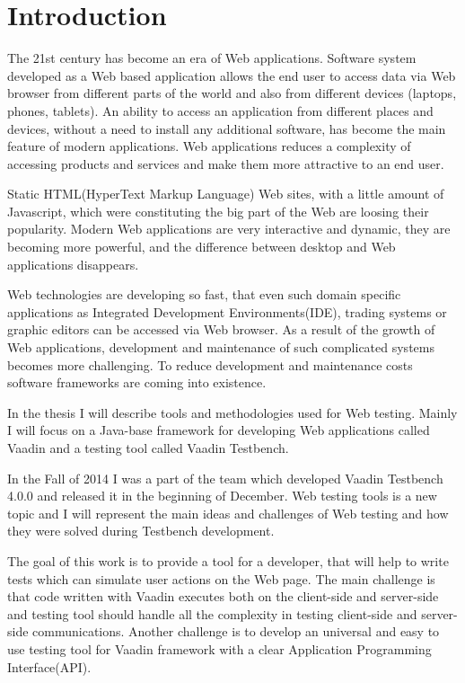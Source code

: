 	
	 \chapter{Introduction}
	 \label{ch:intro} 		
	The 21st century has become an era of Web applications. Software system
	developed as a Web based application allows the end user to access data via
	Web browser from different parts of the world and also from different devices
	(laptops, phones, tablets). An ability to access an application from different
	places and devices, without a need to install any additional software,
	has become the main feature of modern applications. Web applications reduces a
	complexity of accessing products and services and make them more attractive to an end
	user.
	
	Static HTML(HyperText Markup Language) Web sites, with a little amount of
	Javascript, which were constituting the big part of the Web are loosing their popularity.
	Modern Web	applications are very interactive and dynamic, they are becoming
	more powerful, and the difference between desktop and Web applications
	disappears. 
	
	Web technologies are developing so fast, that even such domain
	specific applications as Integrated Development Environments(IDE), trading
	systems or graphic editors can be accessed via Web browser. As a result of the
	growth of Web applications, development and maintenance of such complicated
	systems becomes more challenging. To reduce development and maintenance costs
	software frameworks are coming into existence.
	
	In the thesis I will describe tools and methodologies used for Web testing.
	Mainly I will focus on a Java-base framework for developing Web applications called Vaadin and a testing tool
	called Vaadin Testbench.
	
	 In the Fall of 2014 I was a part of the team which developed Vaadin Testbench
	 4.0.0 and released it in the beginning of December. Web testing tools is a
	 new topic and I will represent the main ideas and challenges
	 of Web testing and how they were solved during Testbench development.
	 
	 The goal of this work is to provide a tool for a developer, that will help to
	 write tests which can simulate user actions on the Web page. The main
	 challenge is that code written with Vaadin executes both on the
	 client-side and server-side and testing tool should handle all the complexity
	 in testing client-side and server-side communications. Another challenge is to
	 develop an universal and easy to use testing tool for Vaadin framework with a
	 clear Application Programming Interface(API).
	 
